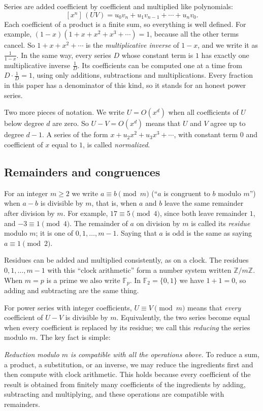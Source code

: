 \documentclass[11pt,a4paper]{article}
\theoremstyle{definition}
\theoremstyle{remark}
\newcommand{\Z}{\mathbb{Z}}
\newcommand{\F}{\mathbb{F}}
\newcommand{\coeff}[2]{[x^{#1}]\,#2}
\begin{document}
Series are added coefficient by coefficient and multiplied like polynomials:
\[
\coeff{n}{(UV)}=u_0v_n+u_1v_{n-1}+\cdots+u_nv_0 .
\]
Each coefficient of a product is a finite sum, so everything is well defined. For example,
$(1-x)(1+x+x^2+x^3+\cdots)=1$, because all the other terms cancel. So $1+x+x^2+\cdots$ is the
\emph{multiplicative inverse} of $1-x$, and we write it as $\frac{1}{1-x}$. In the same way, every series $D$ whose
constant term is $1$ has exactly one multiplicative inverse $\frac1D$. Its coefficients can be computed one at a time
from $D\cdot\frac1D=1$, using only additions, subtractions and multiplications. Every fraction in this paper has a
denominator of this kind, so it stands for an honest power series.

Two more pieces of notation. We write $U=O(x^d)$ when all coefficients of $U$ below degree $d$ are zero. So
$U-V=O(x^d)$ means that $U$ and $V$ agree up to degree $d-1$. A series of the form $x+u_2x^2+u_3x^3+\cdots$, with
constant term $0$ and coefficient of $x$ equal to $1$, is called \emph{normalized}.

\subsection{Remainders and congruences}
For an integer $m\ge2$ we write $a\equiv b\pmod m$ (``$a$ is congruent to $b$ modulo $m$'') when $a-b$ is divisible by
$m$, that is, when $a$ and $b$ leave the same remainder after division by $m$. For example, $17\equiv5\pmod 4$, since both leave remainder $1$, and $-3\equiv1\pmod4$. The
remainder of $a$ on division by $m$ is called its \emph{residue} modulo $m$; it is one of $0,1,\dots,m-1$. Saying that
$a$ is odd is the same as saying $a\equiv1\pmod2$.

Residues can be added and multiplied consistently, as on a clock. The residues $0,1,\dots,m-1$ with this ``clock
arithmetic'' form a number system written $\Z/m\Z$. When $m=p$ is a prime we also write $\F_p$. In $\F_2=\{0,1\}$ we
have $1+1=0$, so adding and subtracting are the same thing.

For power series with integer coefficients, $U\equiv V\pmod m$ means that \emph{every} coefficient of $U-V$ is
divisible by $m$. Equivalently, the two series become equal when every coefficient is replaced by its residue; we call
this \emph{reducing} the series modulo $m$. The key fact is simple:

\emph{Reduction modulo $m$ is compatible with all the operations above.} To reduce a sum, a product, a substitution, or
an inverse, we may reduce the ingredients first and then compute with clock arithmetic. This holds because every
coefficient of the result is obtained from finitely many coefficients of the ingredients by adding, subtracting and
multiplying, and these operations are compatible with remainders.
\end{document}
